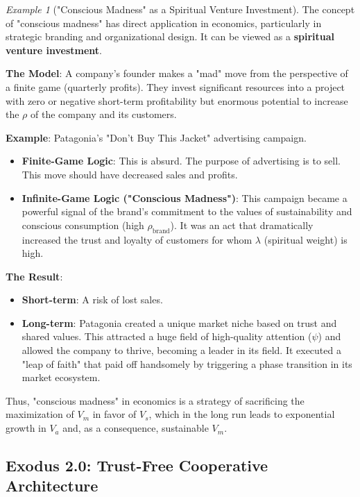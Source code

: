 \documentclass[11pt,a4paper]{article}
\theoremstyle{definition}
\theoremstyle{remark}
\newtheorem{example}{Example}[section]
\begin{document}
\begin{small}
\begin{enumerate}
\begin{example}["Conscious Madness" as a Spiritual Venture Investment]
The concept of "conscious madness" has direct application in economics, particularly in strategic branding and organizational design. It can be viewed as a \textbf{spiritual venture investment}.

\textbf{The Model}: A company's founder makes a "mad" move from the perspective of a finite game (quarterly profits). They invest significant resources into a project with zero or negative short-term profitability but enormous potential to increase the $\rho$ of the company and its customers.

\textbf{Example}: Patagonia's "Don't Buy This Jacket" advertising campaign.
\begin{itemize}
    \item \textbf{Finite-Game Logic}: This is absurd. The purpose of advertising is to sell. This move should have decreased sales and profits.
    \item \textbf{Infinite-Game Logic ("Conscious Madness")}: This campaign became a powerful signal of the brand's commitment to the values of sustainability and conscious consumption (high $\rho_{\text{brand}}$). It was an act that dramatically increased the trust and loyalty of customers for whom $\lambda$ (spiritual weight) is high.
\end{itemize}

\textbf{The Result}:
\begin{itemize}
    \item \textbf{Short-term}: A risk of lost sales.
    \item \textbf{Long-term}: Patagonia created a unique market niche based on trust and shared values. This attracted a huge field of high-quality attention ($\psi$) and allowed the company to thrive, becoming a leader in its field. It executed a "leap of faith" that paid off handsomely by triggering a phase transition in its market ecosystem.
\end{itemize}
Thus, "conscious madness" in economics is a strategy of sacrificing the maximization of $V_m$ in favor of $V_s$, which in the long run leads to exponential growth in $V_a$ and, as a consequence, sustainable $V_m$.
\end{example}

\subsection{Exodus 2.0: Trust-Free Cooperative Architecture}


\end{enumerate}
\end{small}
\end{document}
